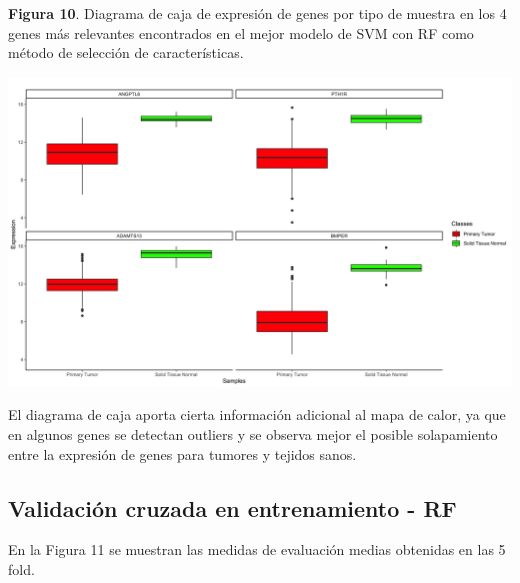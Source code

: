 \newpage
\textbf{Figura 10}. Diagrama de caja de expresión de genes por tipo de muestra en los 4 genes más relevantes encontrados en el mejor modelo de SVM con RF como método de selección de características.
\begin{center}
	\includegraphics[width=1\textwidth]{figuras/10_higado_biclase_17_svm_boxplots_mejor_metodo.png} 
\end{center}

El diagrama de caja aporta cierta información adicional al mapa de calor, ya que en algunos genes se detectan outliers y se observa mejor el posible solapamiento entre la expresión de genes para tumores y tejidos sanos.

\newpage
\subsection{Validación cruzada en entrenamiento - RF}

En la Figura 11 se muestran las medidas de evaluación medias obtenidas en las 5 fold.\\

